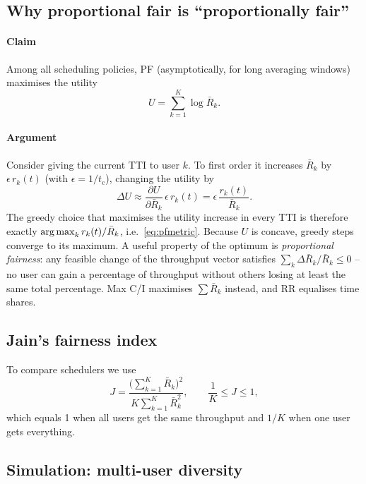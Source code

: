 \documentclass[11pt,a4paper]{article}
\begin{document}
\subsection{Why proportional fair is ``proportionally fair''}\label{sec:pf}
\paragraph{Claim} Among all scheduling policies, PF (asymptotically, for long averaging windows)
maximises the utility
\begin{equation}\label{eq:util}
  U = \sum_{k=1}^{K}\log \bar R_k .
\end{equation}
\paragraph{Argument} Consider giving the current TTI to user $k$. To first order it increases
$\bar R_k$ by $\epsilon\,r_k(t)$ (with $\epsilon = 1/t_\mathrm{c}$), changing the utility by
\begin{equation}
  \Delta U \approx \frac{\partial U}{\partial \bar R_k}\,\epsilon\,r_k(t) = \epsilon\,\frac{r_k(t)}{\bar R_k}.
\end{equation}
The greedy choice that maximises the utility increase in every TTI is therefore exactly
$\operatorname{arg\,max}_k r_k(t)/\bar R_k$, i.e.\ \cref{eq:pfmetric}. Because $U$ is concave, greedy steps converge to
its maximum. A useful property of the optimum is \emph{proportional fairness}: any feasible change of
the throughput vector satisfies $\sum_k \Delta\bar R_k/\bar R_k \le 0$ -- no user can gain a percentage
of throughput without others losing at least the same total percentage. Max C/I maximises $\sum \bar R_k$
instead, and RR equalises time shares.

\subsection{Jain's fairness index}
To compare schedulers we use \cite{jain1984fairness}
\begin{equation}\label{eq:jain}
  J = \frac{\bigl(\sum_{k=1}^{K}\bar R_k\bigr)^2}{K\sum_{k=1}^{K}\bar R_k^2}, \qquad \frac{1}{K}\le J\le 1,
\end{equation}
which equals 1 when all users get the same throughput and $1/K$ when one user gets everything.

\subsection{Simulation: multi-user diversity}\label{sec:sim}
\end{document}
